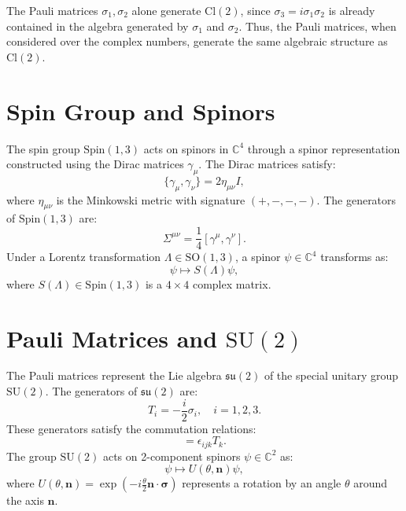 \documentclass{article}
\begin{document}
The Pauli matrices $\sigma_1, \sigma_2$ alone generate $\text{Cl}(2)$, since 
$\sigma_3 = i \sigma_1 \sigma_2$ is already contained in the algebra
generated by $\sigma_1$ and $\sigma_2$. Thus, the Pauli matrices, when
considered over the complex numbers, generate the same algebraic structure
as $\text{Cl}(2)$.

\section*{Spin Group and Spinors}

The spin group $\text{Spin}(1, 3)$ acts on spinors in $\mathbb{C}^4$ through
a spinor representation constructed using the Dirac matrices $\gamma_\mu$.
The Dirac matrices satisfy: 
\begin{equation*}
\{ \gamma_\mu, \gamma_\nu \} = 2 \eta_{\mu\nu} I, 
\end{equation*}
where $\eta_{\mu\nu}$ is the Minkowski metric with signature $(+, -, -, -)$.
The generators of $\text{Spin}(1, 3)$ are: 
\begin{equation*}
\Sigma^{\mu\nu} = \frac{1}{4} [\gamma^\mu, \gamma^\nu]. 
\end{equation*}
Under a Lorentz transformation $\Lambda \in \text{SO}(1, 3)$, a spinor $\psi
\in \mathbb{C}^4$ transforms as: 
\begin{equation*}
\psi \mapsto S(\Lambda) \psi, 
\end{equation*}
where $S(\Lambda) \in \text{Spin}(1, 3)$ is a $4 \times 4$ complex matrix.

\section*{Pauli Matrices and $\text{SU}(2)$}

The Pauli matrices represent the Lie algebra $\mathfrak{su}(2)$ of the
special unitary group $\text{SU}(2)$. The generators of $\mathfrak{su}(2)$
are: 
\begin{equation*}
T_i = -\frac{i}{2} \sigma_i, \quad i = 1, 2, 3. 
\end{equation*}
These generators satisfy the commutation relations: 
\begin{equation*}
[T_i, T_j] = \epsilon_{ijk} T_k. 
\end{equation*}
The group $\text{SU}(2)$ acts on 2-component spinors $\psi \in \mathbb{C}^2$
as: 
\begin{equation*}
\psi \mapsto U(\theta, \mathbf{n}) \psi, 
\end{equation*}
where $U(\theta, \mathbf{n}) = \exp\left( -i \frac{\theta}{2} \mathbf{n}
\cdot \boldsymbol{\sigma} \right)$ represents a rotation by an angle $\theta$
around the axis $\mathbf{n}$.
\end{document}
